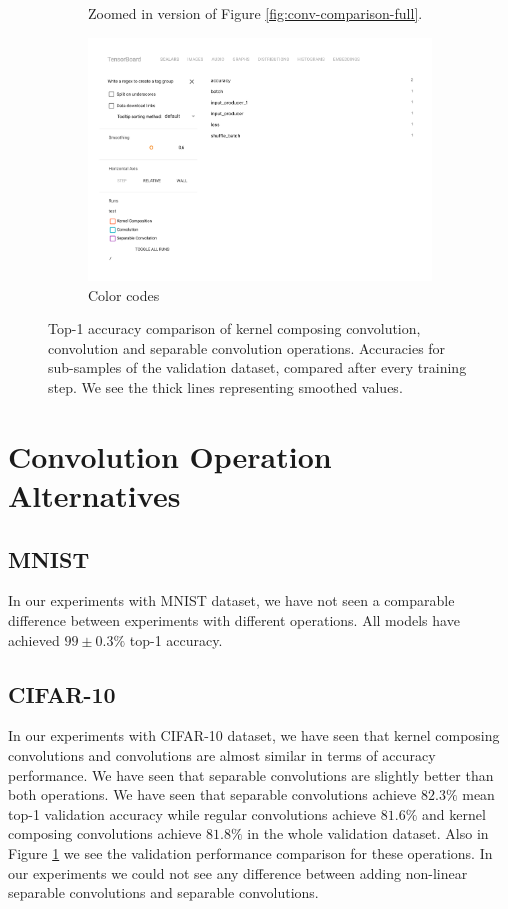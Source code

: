 \begin{figure}[!h]
\begin{subfigure}{.79\textwidth}
        \caption{Zoomed in version of Figure \ref{fig:conv-comparison-full}.}
  \end{subfigure}
  \begin{subfigure}{.49\textwidth}
        \includegraphics[width=1\linewidth]{images/convolution-comparison-legend.pdf}
        \caption{Color codes}
  \end{subfigure}
  \caption{Top-1 accuracy comparison of kernel composing convolution, convolution and separable convolution operations. Accuracies for sub-samples of the validation dataset, compared after every training step. We see the thick lines representing smoothed values.}
  \label{fig:conv-comparison}
\end{figure}

\section{Convolution Operation Alternatives}
\subsection{MNIST}
In our experiments with MNIST dataset, we have not seen a comparable difference between experiments with different operations. All models have achieved $99\pm0.3\%$ top-1 accuracy.
\subsection{CIFAR-10}
In our experiments with CIFAR-10 dataset, we have seen that kernel composing convolutions and convolutions are almost similar in terms of accuracy performance. We have seen that separable convolutions are slightly better than both operations. We have seen that separable convolutions achieve $82.3\%$ mean top-1 validation accuracy while regular convolutions achieve $81.6\%$ and kernel composing convolutions achieve $81.8\%$ in the whole validation dataset. Also in Figure \ref{fig:conv-comparison} we see the validation performance comparison for these operations. In our experiments we could not see any difference between adding non-linear separable convolutions and separable convolutions. 

